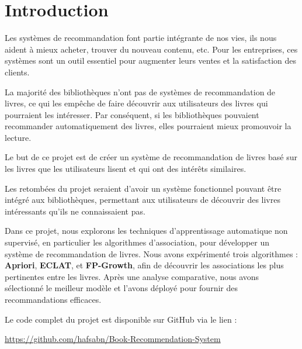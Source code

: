 \documentclass[a4paper, 12pt]{article}
\begin{document}
\tableofcontents %
\newpage
\pagestyle{fancy}
\begin{minipage}{\textwidth}

\section{Introduction}

\vspace{1cm}
\justifying

\hspace{1cm}Les systèmes de recommandation font partie intégrante de nos vies, ils nous aident à mieux acheter, trouver du nouveau contenu, etc. Pour les entreprises, ces systèmes sont un outil essentiel pour augmenter leurs ventes et la satisfaction des clients.

La majorité des bibliothèques n’ont pas de systèmes de recommandation de livres, ce qui les empêche de faire découvrir aux utilisateurs des livres qui pourraient les intéresser. Par conséquent, si les bibliothèques pouvaient recommander automatiquement des livres, elles pourraient mieux promouvoir la lecture.\vspace{0.5cm}

Le but de ce projet est de créer un système de recommandation de livres basé sur les livres que les utilisateurs lisent et qui ont des intérêts similaires.\vspace{0.5cm}

Les retombées du projet seraient d’avoir un système fonctionnel pouvant être intégré aux bibliothèques, permettant aux utilisateurs de découvrir des livres intéressants qu’ils ne connaissaient pas.\vspace{0.5cm}

Dans ce projet, nous explorons les techniques d’apprentissage automatique non supervisé, en particulier les algorithmes d’association, pour développer un système de recommandation de livres. Nous avons expérimenté trois algorithmes : \textbf{Apriori}, \textbf{ECLAT}, et \textbf{FP-Growth}, afin de découvrir les associations les plus pertinentes entre les livres. Après une analyse comparative, nous avons sélectionné le meilleur modèle et l'avons déployé pour fournir des recommandations efficaces.\vspace{0.5cm}

Le code complet du projet est disponible sur GitHub via le lien :\vspace{0.2cm}

\url{https://github.com/hafsabn/Book-Recommendation-System}
\end{minipage}
\end{document}
